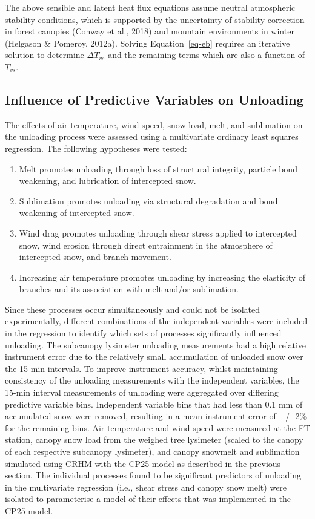 \documentclass[
  letterpaper,
]{tex/uofsthesis-cs}
\providecommand{\tightlist}{%
  \setlength{\itemsep}{0pt}\setlength{\parskip}{0pt}}
\begin{document}
The above sensible and latent heat flux equations assume neutral
atmospheric stability conditions, which is supported by the uncertainty
of stability correction in forest canopies (Conway et al., 2018) and
mountain environments in winter (Helgason \& Pomeroy, 2012a). Solving
Equation~\ref{eq-eb} requires an iterative solution to determine
\(\Delta T_{vs}\) and the remaining terms which are also a function of
\(T_{vs}\).

\subsection{Influence of Predictive Variables on
Unloading}\label{influence-of-predictive-variables-on-unloading}

The effects of air temperature, wind speed, snow load, melt, and
sublimation on the unloading process were assessed using a multivariate
ordinary least squares regression. The following hypotheses were tested:

\begin{enumerate}
\def\labelenumi{\alph{enumi}.}
\tightlist
\item
  Melt promotes unloading through loss of structural integrity, particle
  bond weakening, and lubrication of intercepted snow.
\item
  Sublimation promotes unloading via structural degradation and bond
  weakening of intercepted snow.
\item
  Wind drag promotes unloading through shear stress applied to
  intercepted snow, wind erosion through direct entrainment in the
  atmosphere of intercepted snow, and branch movement.
\item
  Increasing air temperature promotes unloading by increasing the
  elasticity of branches and its association with melt and/or
  sublimation.
\end{enumerate}

Since these processes occur simultaneously and could not be isolated
experimentally, different combinations of the independent variables were
included in the regression to identify which sets of processes
significantly influenced unloading. The subcanopy lysimeter unloading
measurements had a high relative instrument error due to the relatively
small accumulation of unloaded snow over the 15-min intervals. To
improve instrument accuracy, whilst maintaining consistency of the
unloading measurements with the independent variables, the 15-min
interval measurements of unloading were aggregated over differing
predictive variable bins. Independent variable bins that had less than
0.1 mm of accumulated snow were removed, resulting in a mean instrument
error of +/- 2\% for the remaining bins. Air temperature and wind speed
were measured at the FT station, canopy snow load from the weighed tree
lysimeter (scaled to the canopy of each respective subcanopy lysimeter),
and canopy snowmelt and sublimation simulated using CRHM with the CP25
model as described in the previous section. The individual processes
found to be significant predictors of unloading in the multivariate
regression (i.e., shear stress and canopy snow melt) were isolated to
parameterise a model of their effects that was implemented in the CP25
model.
\end{document}
